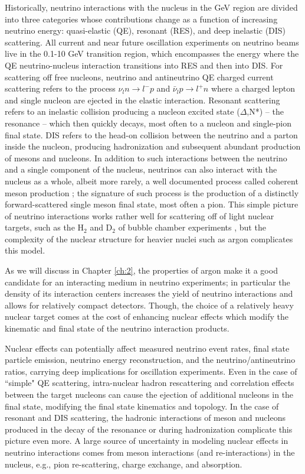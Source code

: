 Historically, neutrino interactions with the nucleus in the GeV region are divided into three categories  whose contributions change as a function of increasing neutrino energy: quasi-elastic (QE), resonant (RES), and deep inelastic (DIS) scattering. All current and near future oscillation experiments on neutrino beams live in the 0.1-10 GeV transition region, which encompasses the energy where the QE neutrino-nucleus interaction transitions into RES and then into DIS. 
For scattering off free nucleons, neutrino and antineutrino QE charged current scattering refers to the process $\nu_l n \rightarrow l^- p$ and $\bar\nu_l p \rightarrow l^+ n$ where a charged lepton and single nucleon are ejected in the elastic interaction. %
 Resonant scattering refers to an inelastic collision producing a nucleon excited state ($\Delta$,N*) -- the resonance -- which then quickly decays, most often to a nucleon and single-pion final state. DIS refers to the head-on collision between the neutrino and a parton inside the nucleon, producing hadronization and subsequent  abundant production of mesons and nucleons.  In addition to such interactions between the neutrino and a single component of the nucleus, neutrinos can also interact with the nucleus as a whole, albeit more rarely, a well documented process called coherent meson production \cite{Vilain1993}; the signature of such process is the production of a distinctly forward-scattered single meson final state, most often a pion.  This simple picture of neutrino interactions works rather well for scattering 
off of light nuclear targets, such as the H$_2$ and D$_2$ of bubble chamber experiments \cite{RevModPhys.84.1307}, but the complexity of the nuclear structure for heavier nuclei such as argon complicates this model. 


As we will discuss in Chapter \ref{ch:2}, the properties of argon make it a good candidate for an interacting medium in neutrino experiments; in particular the density of its interaction centers  increases the yield of neutrino interactions and allows for relatively compact detectors. Though, the choice of a relatively heavy nuclear target comes at the cost of enhancing  nuclear effects which modify the kinematic and final state of the neutrino interaction products.  

Nuclear effects can potentially affect measured neutrino event rates, final state particle emission, neutrino energy reconstruction, and the neutrino/antineutrino ratios, carrying deep implications for oscillation experiments. 
Even in the case of ``simple" QE scattering, intra-nuclear hadron rescattering and correlation effects between the target nucleons can cause the ejection of additional nucleons in the final state, modifying the final state kinematics and topology. In the case of resonant and DIS scattering, the hadronic interactions of meson and nucleons produced in the decay of the resonance or during hadronization  complicate this picture even more.
A large source of uncertainty in modeling  nuclear effects in neutrino interactions comes from meson interactions (and re-interactions) in the nucleus, e.g., pion re-scattering, charge exchange, and absorption.

